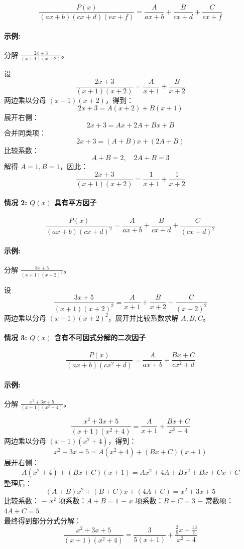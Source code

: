 \documentclass[8pt,a4paper,twoside]{tau-class/tau}
\begin{document}
\[
    \frac{P(x)}{(ax+b)(cx+d)(ex+f)} = \frac{A}{ax+b} + \frac{B}{cx+d} + \frac{C}{ex+f}
\]

\paragraph{示例:} 分解 $\frac{2x+3}{(x+1)(x+2)}$。

设
\[
    \frac{2x+3}{(x+1)(x+2)} = \frac{A}{x+1} + \frac{B}{x+2}
\]
两边乘以分母 $(x+1)(x+2)$，得到：
\[
    2x + 3 = A(x+2) + B(x+1)
\]
展开右侧：
\[
    2x + 3 = Ax + 2A + Bx + B
\]
合并同类项：
\[
    2x + 3 = (A+B)x + (2A+B)
\]
比较系数：
\[
    A+B = 2, \quad 2A+B = 3
\]
解得 $A=1, B=1$，因此：
\[
    \frac{2x+3}{(x+1)(x+2)} = \frac{1}{x+1} + \frac{1}{x+2}
\]

\paragraph{情况 2: $Q(x)$ 具有平方因子}

\[
    \frac{P(x)}{(ax+b)(cx+d)^2} = \frac{A}{ax+b} + \frac{B}{cx+d} + \frac{C}{(cx+d)^2}
\]

\paragraph{示例:} 分解 $\frac{3x+5}{(x+1)(x+2)^2}$。

设
\[
    \frac{3x+5}{(x+1)(x+2)^2} = \frac{A}{x+1} + \frac{B}{x+2} + \frac{C}{(x+2)^2}
\]
两边乘以分母 $(x+1)(x+2)^2$，展开并比较系数求解 $A, B, C$。

\paragraph{情况 3: $Q(x)$ 含有不可因式分解的二次因子}

\[
    \frac{P(x)}{(ax+b)(cx^2+d)} = \frac{A}{ax+b} + \frac{Bx+C}{cx^2+d}
\]
\paragraph{示例:} 分解 $\frac{x^2+3x+5}{(x+1)(x^2+4)}$。

\[
    \frac{x^2+3x+5}{(x+1)(x^2+4)} = \frac{A}{x+1} + \frac{Bx+C}{x^2+4}
\]
两边乘以分母 $(x+1)(x^2+4)$，得到：
\[
x^2 + 3x + 5 = A(x^2+4) + (Bx+C)(x+1)
\]
展开右侧：
\[
A(x^2+4) + (Bx+C)(x+1) = Ax^2 + 4A + Bx^2 + Bx + Cx + C
\]
整理后：
\[
(A+B)x^2 + (B+C)x + (4A + C) = x^2 + 3x + 5
\]
比较系数：
− $x^2$ 项系数：$A + B = 1$
− $x$ 项系数：$B + C = 3$
− 常数项：$4A + C = 5$
\\
最终得到部分分式分解：
\[
\frac{x^2+3x+5}{(x+1)(x^2+4)} = \frac{3}{5(x+1)} + \frac{\frac{2}{5}x + \frac{13}{5}}{x^2+4}
\]
\newpage
\end{document}
